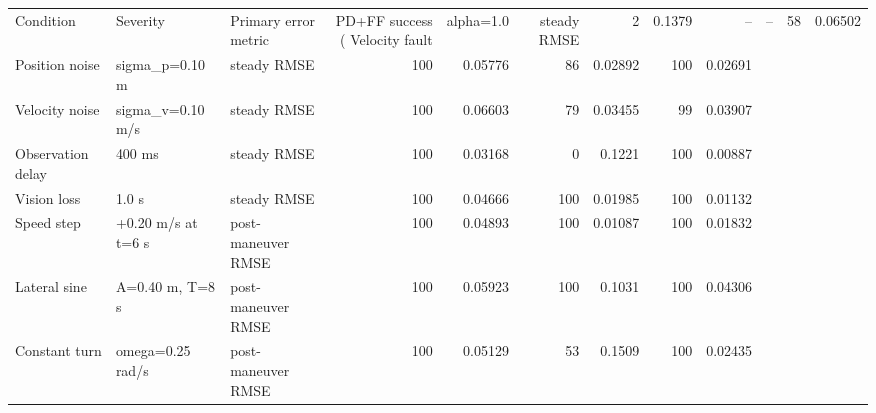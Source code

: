 \begin{tabular}{lllrrrrrr}
\toprule
Condition & Severity & Primary error metric & PD+FF success (%
\midrule
Velocity fault & alpha=1.0 & steady RMSE & 2 & 0.1379 & -- & -- & 58 & 0.06502 \\
Position noise & sigma_p=0.10 m & steady RMSE & 100 & 0.05776 & 86 & 0.02892 & 100 & 0.02691 \\
Velocity noise & sigma_v=0.10 m/s & steady RMSE & 100 & 0.06603 & 79 & 0.03455 & 99 & 0.03907 \\
Observation delay & 400 ms & steady RMSE & 100 & 0.03168 & 0 & 0.1221 & 100 & 0.00887 \\
Vision loss & 1.0 s & steady RMSE & 100 & 0.04666 & 100 & 0.01985 & 100 & 0.01132 \\
Speed step & +0.20 m/s at t=6 s & post-maneuver RMSE & 100 & 0.04893 & 100 & 0.01087 & 100 & 0.01832 \\
Lateral sine & A=0.40 m, T=8 s & post-maneuver RMSE & 100 & 0.05923 & 100 & 0.1031 & 100 & 0.04306 \\
Constant turn & omega=0.25 rad/s & post-maneuver RMSE & 100 & 0.05129 & 53 & 0.1509 & 100 & 0.02435 \\
\bottomrule
\end{tabular}
